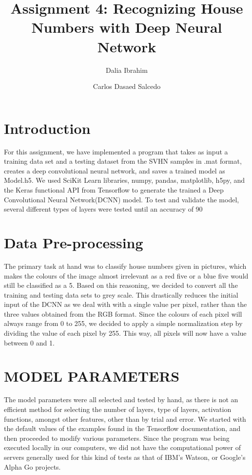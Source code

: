 \documentclass{article}
\author[1]{Dalia Ibrahim}
\author[2]{Carlos Dasaed Salcedo}
\affil[ ]{Studnet ID}
\affil[1]{201893217}
\affil[2]{201892008}
\begin{document}
  

\title{ Assignment 4: Recognizing  House Numbers with Deep Neural Network }


\maketitle
 \section{Introduction}

For this assignment, we have implemented a program that takes as input a training data set and a testing dataset from the SVHN samples in .mat format, creates a deep convolutional neural network, and saves a trained model as Model.h5. We used SciKit Learn libraries, numpy, pandas, matplotlib, h5py, and the Keras functional API from Tensorflow to generate the trained a Deep  Convolutional Neural Network(DCNN) model. To test and validate the model, several different types of layers were tested until an accuracy of 90%


\section{Data Pre-processing}
The primary task at hand was to classify house numbers given in pictures, which makes the colours of the image almost irrelevant as a red five or a blue five would still be classified as a 5. Based on this reasoning, we decided to convert all the training and testing data sets to grey scale. This drastically reduces the initial input of the DCNN as we deal with with a single value per pixel, rather than the three values obtained from the RGB format. Since the colours of each pixel will always range from 0 to 255, we decided to apply a simple normalization step by dividing the value of each pixel by 255. This way, all pixels will now have a value between 0 and 1.

\section{MODEL PARAMETERS}

The model parameters were all selected and tested by hand, as there is not an efficient method for selecting the number of layers, type of layers, activation functions, amongst other features, other than by trial and error. We started with the default values of the examples found in the Tensorflow documentation, and then proceeded to modify various parameters. Since the program was being executed locally in our computers, we did not have the computational power of servers generally used for this kind of tests as that of IBM’s Watson, or Google’s Alpha Go projects. 
\end{document}
